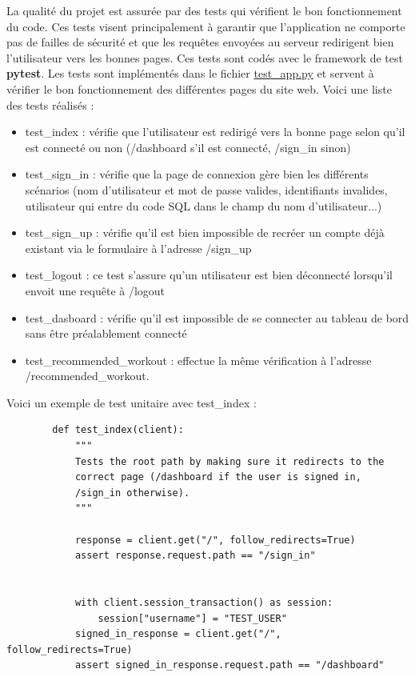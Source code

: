 \documentclass[french]{article}
\begin{document}
    La qualité du projet est assurée par des tests qui vérifient le bon fonctionnement du code. Ces tests visent principalement à garantir que l'application ne comporte pas de failles de sécurité et que les requêtes envoyées au serveur redirigent bien l'utilisateur vers les bonnes pages. Ces tests sont codés avec le framework de test \textbf{pytest}. Les tests sont implémentés dans le fichier \href{https://github.com/vinpap/adrenaline.ai/blob/main/test_app.py}{test\_app.py} et servent à vérifier le bon fonctionnement des différentes pages du site web. Voici une liste des tests réalisés :
    \begin{itemize}
        \item test\_index : vérifie que l'utilisateur est redirigé vers la bonne page selon qu'il est connecté ou non (/dashboard s'il est connecté, /sign\_in sinon)
        \item test\_sign\_in : vérifie que la page de connexion gère bien les différents scénarios (nom d'utilisateur et mot de passe valides, identifiants invalides, utilisateur qui entre du code SQL dans le champ du nom d'utilisateur...)
        \item test\_sign\_up : vérifie qu'il est bien impossible de recréer un compte déjà existant via le formulaire à l'adresse /sign\_up
        \item test\_logout : ce test s'assure qu'un utilisateur est bien déconnecté lorsqu'il envoit une requête à /logout
        \item test\_dasboard : vérifie qu'il est impossible de se connecter au tableau de bord sans être préalablement connecté
        \item test\_recommended\_workout : effectue la même vérification à l'adresse /recommended\_workout.
    \end{itemize}
    
    Voici un exemple de test unitaire avec test\_index :
    \begin{verbatim}
        def test_index(client):
            """
            Tests the root path by making sure it redirects to the 
            correct page (/dashboard if the user is signed in,
            /sign_in otherwise).
            """

            response = client.get("/", follow_redirects=True)
            assert response.request.path == "/sign_in"


            with client.session_transaction() as session:
                session["username"] = "TEST_USER"
            signed_in_response = client.get("/", follow_redirects=True)
            assert signed_in_response.request.path == "/dashboard"
    \end{verbatim}
\end{document}
